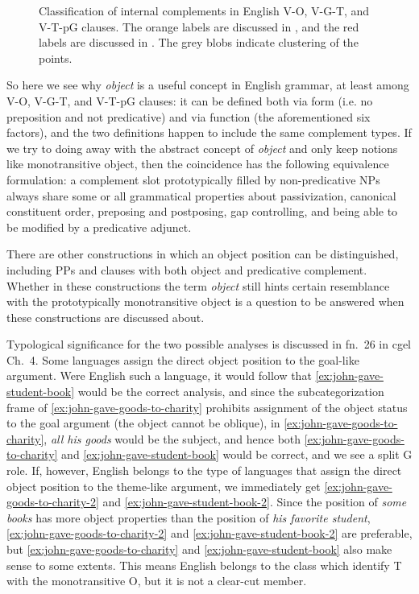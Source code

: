 \documentclass[UTF8, a4paper, oneside, scheme=plain, 12pt]{ctexbook}
\newcommand*{\citechap}[1]{Ch.~{#1}}
\newcommand*{\citefootnote}[1]{fn.~{#1}}
\newcommand*{\term}[1]{\emph{#1}}
\newcommand{\form}[1]{\emph{#1}}
\begin{document}
\begin{figure}[H]
    \centering
    
    \caption{Classification of internal complements in English V-O, V-G-T, and V-T-pG clauses.
    The orange labels are discussed in ,
    and the red labels are discussed in .
    The grey blobs indicate clustering of the points.}
    \label{fig:english-object}
\end{figure}

So here we see why \term{object} is a useful concept in English grammar,
at least among V-O, V-G-T, and V-T-pG clauses:
it can be defined both via form (i.e. no preposition and not predicative)
and via function (the aforementioned six factors),
and the two definitions happen to include the same complement types.
If we try to doing away with the abstract concept of \term{object}
and only keep notions like monotransitive object,
then the coincidence has the following equivalence formulation:
a complement slot prototypically filled by non-predicative NPs
always share some or all grammatical properties
about passivization, canonical constituent order,
preposing and postposing, gap controlling, 
and being able to be modified by a predicative adjunct. 

There are other constructions in which an object position can be distinguished,
including PPs and clauses with both object and predicative complement. %
Whether in these constructions the term \term{object} still hints 
certain resemblance with the prototypically monotransitive object 
is a question to be answered when these constructions are discussed about.


Typological significance for the two possible analyses is discussed in
\citefootnote{26} in \ac{cgel} \citechap{4}.
Some languages assign the direct object position to the goal-like argument.
Were English such a language, 
it would follow that \eqref{ex:john-gave-student-book} would be the correct analysis,
and since the subcategorization frame of \eqref{ex:john-gave-goods-to-charity} 
prohibits assignment of the object status to the goal argument
(the object cannot be oblique),
in \eqref{ex:john-gave-goods-to-charity},
\form{all his goods} would be the subject,
and hence both \eqref{ex:john-gave-goods-to-charity} and \eqref{ex:john-gave-student-book} 
would be correct,
and we see a split G role.
If, however, English belongs to the type of languages 
that assign the direct object position to the theme-like argument,
we immediately get \eqref{ex:john-gave-goods-to-charity-2} and \eqref{ex:john-gave-student-book-2}.
Since the position of \form{some books} has more object properties 
than the position of \form{his favorite student},
\eqref{ex:john-gave-goods-to-charity-2} and \eqref{ex:john-gave-student-book-2} are preferable,
but \eqref{ex:john-gave-goods-to-charity} and \eqref{ex:john-gave-student-book} also make sense 
to some extents.
This means English belongs to the class which identify T with the monotransitive O, 
but it is not a clear-cut member.
\end{document}
